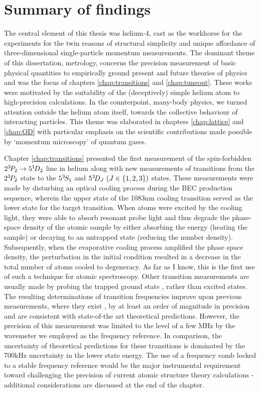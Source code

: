 \section*{Summary of findings}
	{The} central element of this thesis was helium-4, cast as the workhorse for the experiments for the twin reasons of structural simplicity and unique affordance of three-dimensional single-particle momentum measurements.
	The dominant theme of this dissertation,  metrology, concerns the precision measurement of basic physical quantities to empirically ground present and future theories of physics and was the focus of chapters \ref{chap:transitions} and \ref{chap:tuneout}. 
	These works were motivated by the suitability of the (deceptively) simple helium atom to high-precision calculations.
	In the counterpoint, many-body physics, we turned attention outside the helium atom itself, towards the collective behaviour of interacting particles.
	This theme was elaborated in chapters \ref{chap:lattice} and \ref{chap:QD} with particular emphasis on the scientific contributions made possible by `momentum microscopy' of quantum gases.

	Chapter \ref{chap:transitions} presented the first measurement of the spin-forbidden $2^{3\!} P_2\rightarrow 5^{1\!} D_2$ line in helium along with new measurements of transitions from the $2^{3\!} P_2$ state to the $5^{3\!} S_1$ and $5^{3\!} D_J~(J\in\{1,2,3\})$ states. 
	These measurements were made by disturbing an optical cooling process during the BEC production sequence, wherein the upper state of the 1083nm cooling transition served as the lower state for the target transition. 
	When atoms were excited by the cooling light, they were able to absorb resonant probe light and thus degrade the phase-space density of the atomic sample by either absorbing the energy (heating the sample) or decaying to an untrapped state (reducing the number density).
	Subsequently, when the evaporative cooling process amplified the phase space density, the perturbation in the initial condition resulted in a decrease in the total number of atoms cooled to degeneracy.
	As far as I know, this is the first use of such a technique for atomic spectroscopy.
	Other transition measurements are usually made by probing the trapped ground state \cite{Thomas20,Rengelink18,Notermans14}, rather than excited states.
	The resulting determinations of transition frequencies improve upon previous measurements, where they exist \cite{Martin60}, by at least an order of magnitude in precision and are consistent with state-of-the art theoretical predictions.
	However, the precision of this measurement was limited to the level of a few MHz by the wavemeter we employed as the frequency reference.
	In comparison, the uncertainty of theoretical predictions for these transitions is dominated by the 700kHz uncertainty in the lower state energy.
	The use of a frequency comb locked to a stable frequency reference would be the major instrumental requirement toward challenging the precision of current atomic structure theory calculations - additional considerations are discussed at the end of the chapter.
	


